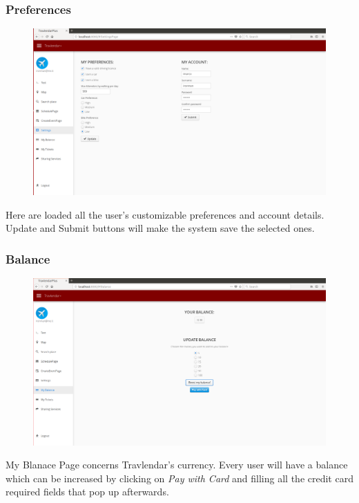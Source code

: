 \documentclass{article}
\begin{document}
			\subsubsection{Preferences}
			\begin{figure}[H]
			\includegraphics[width=\linewidth]{Images/Pages/6-Preferences.png}
			\label{fig:Preferences}
			\end{figure}
		Here are loaded all the user's customizable preferences and account details. Update and Submit buttons will make the system save the selected ones.
			\subsubsection{Balance}
			\begin{figure}[H]
			\includegraphics[width=\linewidth]{Images/Pages/7-Balance.png}
			\label{fig:Balance}
			\end{figure}
	My Blanace Page concerns Travlendar's currency. Every user will have a balance which can be increased by clicking on \textit{Pay with Card} and filling all the credit card required fields that pop up afterwards.
\end{document}
